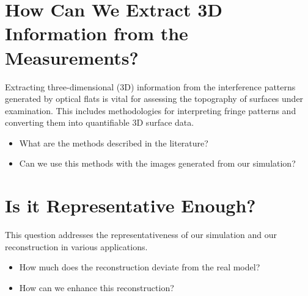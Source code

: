 \documentclass[../main.tex]{subfiles}
\begin{document}
\section{How Can We Extract 3D Information from the Measurements?}
Extracting three-dimensional (3D) information from the interference patterns generated by optical flats is vital for assessing the topography of surfaces under examination. This includes methodologies for interpreting fringe patterns and converting them into quantifiable 3D surface data.
\begin{itemize}
    \item What are the methods described in the literature?
    \item Can we use this methods with the images generated from our simulation?
\end{itemize}

\section{Is it Representative Enough?}
This question addresses the representativeness of our simulation and our reconstruction in various applications.
\begin{itemize}
    \item How much does the reconstruction deviate from the real model?
    \item How can we enhance this reconstruction?
\end{itemize}
\end{document}

